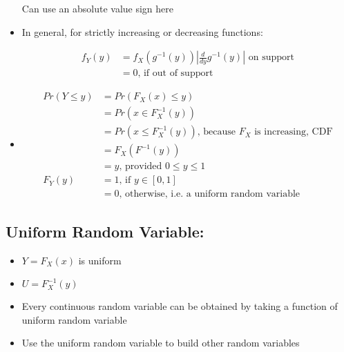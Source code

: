 \documentclass[11pt,letterpaper,titlepage]{article}
\begin{document}
\begin{itemize}
    Can use an absolute value sign here
    
    \item In general, for strictly increasing or decreasing functions:
    
    \begin{equation*}
        \begin{aligned}
            f_Y (y) &= f_X (g^{-1}(y))|\frac{d}{dy} g^{-1}(y)| \text{ on support} \\
            &= 0 \text{, if out of support}
        \end{aligned}
    \end{equation*}
    
    \item 
    
    \begin{equation*}
        \begin{aligned}
            Pr(Y \leq y) &= Pr(F_X(x) \leq y) \\
            &= Pr(x \in F^{-1}_X(y)) \\
            &= Pr(x \leq F^{-1}_X(y)) \text{, because } F_X \text{ is increasing, CDF} \\
            &= F_X(F^{-1}(y)) \\
            &= y \text{, provided } 0 \leq y \leq 1 \\
            F_Y(y) &= 1 \text{, if } y \in [0, 1] \\
            &= 0 \text{, otherwise, i.e. a uniform random variable}
        \end{aligned}
    \end{equation*}
    
\end{itemize}

\subsection{Uniform Random Variable:}

\begin{itemize}
    
    \item $Y=F_X(x)$ is uniform
    
    \item $U=F^{-1}_X(y)$
    
    \item Every continuous random variable can be obtained by taking a function of uniform random variable
    
    \item Use the uniform random variable to build other random variables
\end{itemize}
\end{document}
